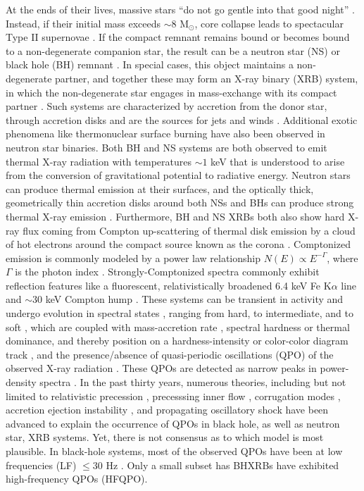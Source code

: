 \documentclass[fleqn,usenatbib,twocolumn]{mnras}%
\begin{document}
At the ends of their lives, massive stars ``do not go gentle into that good night'' \citep{thomas1952country}. Instead, if their initial mass exceeds $\sim8$ M$_\odot$, core collapse leads to spectacular Type II supernovae \citep{Schlegel1995}. If the compact remnant remains bound or becomes bound to a non-degenerate companion star, the result can be a neutron star (NS) or black hole (BH) remnant \citep{gilmore2004}. In special cases, this object maintains a non-degenerate partner, and together these may form an X-ray binary (XRB) system, in which the non-degenerate star engages in mass-exchange with its compact partner \citep{tauris2006}. Such systems are characterized by accretion from the donor star, through accretion disks \citep{SS73} and are the sources for jets \citep{gallo2005,neutronstarjet} and winds \citep{bhwinds,neutronStarWind}. Additional exotic phenomena like thermonuclear surface burning  \citep{thermonuclear} have also been observed in neutron star binaries. Both BH and NS systems are both observed to emit thermal X-ray radiation with temperatures $\sim1$ keV that is understood to arise from the conversion of gravitational potential to radiative energy. Neutron stars can produce thermal emission at their surfaces, and the optically thick, geometrically thin accretion disks around both NSs and BHs can produce strong thermal X-ray emission \citep{SS73}. Furthermore, BH and NS XRBs both also show hard X-ray flux coming from Compton up-scattering of thermal disk emission by a cloud of hot electrons around the compact source known as the corona \citep{corona1979,coronae1982}. Comptonized emission is commonly modeled by a power law relationship $N(E)\propto E^{-\Gamma}$, where $\Gamma$ is the photon index \citep{McClintockRemillard2006}. Strongly-Comptonized spectra commonly exhibit reflection features like a fluorescent, relativistically broadened 6.4 keV Fe K$\alpha$ line \citep{ironlines1989} and $\sim30$ keV Compton hump \citep{x-rayreflectionmodels2005}. These systems can be transient in activity and undergo evolution in spectral states \citep{gardenier2018}, ranging from hard, to intermediate, and to soft \citep{McClintockRemillard2006}, which are coupled with mass-accretion rate \citep{terrabytedone}, spectral hardness or thermal dominance, and thereby position on a hardness-intensity or color-color diagram track \citep{ingram2019}, and the presence/absence of quasi-periodic oscillations (QPO) of the observed X-ray radiation \citep{McClintockRemillard2006}. These QPOs are detected as narrow peaks in power-density spectra \citep{homanBelloniQPOstates}. In the past thirty years, numerous theories, including but not limited to relativistic precession \citep{lense-thirring-original}, precesssing inner flow \citep{precessionandlense}, corrugation modes \citep{corrugation}, accretion ejection instability \citep{accretion-ejection}, and propagating oscillatory shock \citep{propagatingoscillatoryshock} have been advanced to explain the occurrence of QPOs in black hole, as well as neutron star, XRB systems. Yet, there is not consensus as to which model is most plausible. In black-hole systems, most of the observed QPOs have been at low frequencies (LF) $\leq 30$ Hz \citep{belloni2020typeB}. Only a small subset has BHXRBs have exhibited high-frequency QPOs (HFQPO). 
\end{document}
